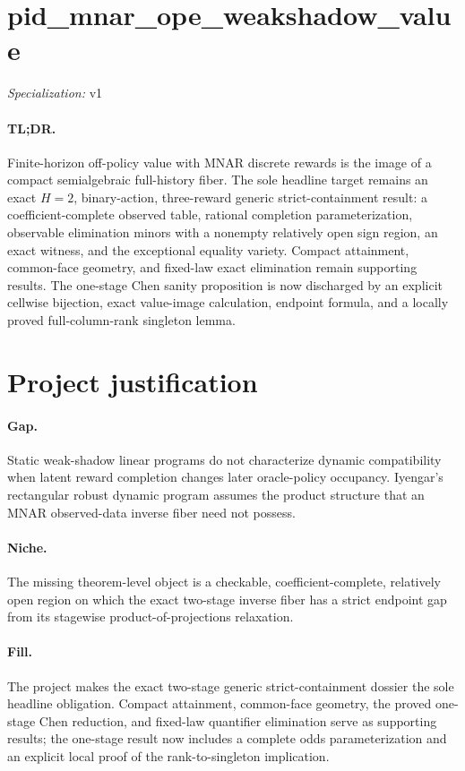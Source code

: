 \documentclass{article}
\begin{document}
\sloppy

\section*{pid\_\allowbreak{}mnar\_\allowbreak{}ope\_\allowbreak{}weakshadow\_\allowbreak{}value}

\noindent\textit{Specialization:} v1\par

\paragraph{TL;DR.} Finite-horizon off-policy value with MNAR discrete rewards is the image of a compact semialgebraic full-history fiber. The sole headline target remains an exact \(H=2\), binary-action, three-reward generic strict-containment result: a coefficient-complete observed table, rational completion parameterization, observable elimination minors with a nonempty relatively open sign region, an exact witness, and the exceptional equality variety. Compact attainment, common-face geometry, and fixed-law exact elimination remain supporting results. The one-stage Chen sanity proposition is now discharged by an explicit cellwise bijection, exact value-image calculation, endpoint formula, and a locally proved full-column-rank singleton lemma.

\section{Project justification}

\paragraph{Gap.} Static weak-shadow linear programs do not characterize dynamic compatibility when latent reward completion changes later oracle-policy occupancy. Iyengar's rectangular robust dynamic program assumes the product structure that an MNAR observed-data inverse fiber need not possess.

\paragraph{Niche.} The missing theorem-level object is a checkable, coefficient-complete, relatively open region on which the exact two-stage inverse fiber has a strict endpoint gap from its stagewise product-of-projections relaxation.

\paragraph{Fill.} The project makes the exact two-stage generic strict-containment dossier the sole headline obligation. Compact attainment, common-face geometry, the proved one-stage Chen reduction, and fixed-law quantifier elimination serve as supporting results; the one-stage result now includes a complete odds parameterization and an explicit local proof of the rank-to-singleton implication.
\end{document}
